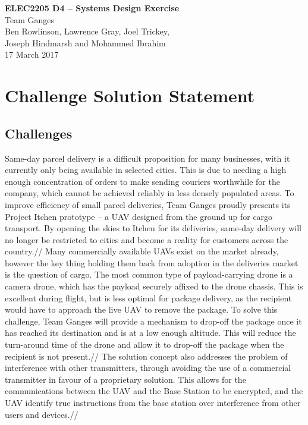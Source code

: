 \documentclass[a4paper,11pt]{article}
\begin{document}
  
\begin{center}
{\Large{\textbf{ELEC2205 D4 -- Systems Design Exercise}}} \\ [\baselineskip]
Team Ganges \\
Ben Rowlinson, Lawrence Gray, Joel Trickey,\\ Joseph Hindmarsh and Mohammed Ibrahim\\
17 March 2017\\
\end{center}

\tableofcontents
\newpage

\section{Challenge Solution Statement}
\subsection{Challenges}
Same-day parcel delivery is a difficult proposition for many businesses, with it currently only being available in selected cities. This is due to needing a high enough concentration of orders to make sending couriers worthwhile for the company, which cannot be achieved reliably in less densely populated areas. To improve efficiency of small parcel deliveries, Team Ganges proudly presents its Project Itchen prototype – a UAV designed from the ground up for cargo transport. By opening the skies to Itchen for its deliveries, same-day delivery will no longer be restricted to cities and become a reality for customers across the country.//
Many commercially available UAVs exist on the market already, however the key thing holding them back from adoption in the deliveries market is the question of cargo. The most common type of payload-carrying drone is a camera drone, which has the payload securely affixed to the drone chassis. This is excellent during flight, but is less optimal for package delivery, as the recipient would have to approach the live UAV to remove the package. To solve this challenge, Team Ganges will provide a mechanism to drop-off the package once it has reached its destination and is at a low enough altitude. This will reduce the turn-around time of the drone and allow it to drop-off the package when the recipient is not present.//
The solution concept also addresses the problem of interference with other transmitters, through avoiding the use of a commercial transmitter in favour of a proprietary solution. This allows for the communications between the UAV and the Base Station to be encrypted, and the UAV identify true instructions from the base station over interference from other users and devices.//
\newpage
\end{document}

